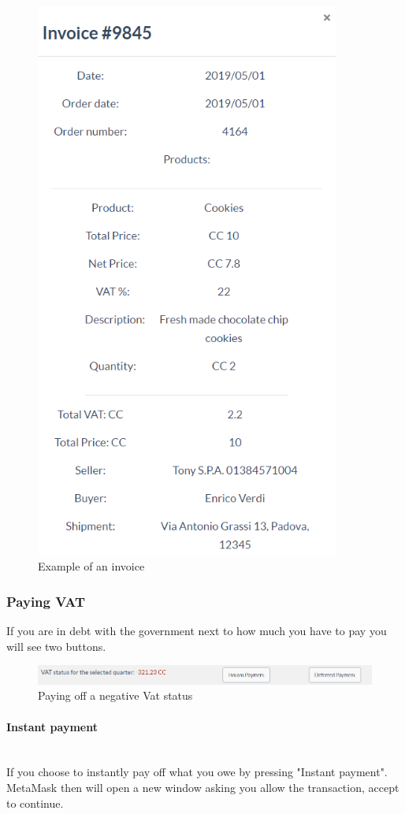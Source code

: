 	\begin{figure}[H]
		\includegraphics[width=10cm]{res/images/invoice_details.png}
		\centering
		\caption{Example of an invoice}
	\end{figure}
	\subsubsection{Paying VAT}
	If you are in debt with the government next to how much you have to pay 
	you will see two buttons.
	\begin{figure}[H]
		\includegraphics[width=15cm]{res/images/paying_vat.png}
		\centering
		\caption{Paying off a negative Vat status}
	\end{figure}
	\paragraph{Instant payment} \mbox{}\\
	If you choose to instantly pay off what you owe by pressing "Instant 
	payment". MetaMask then will open a new window asking you allow the 
	transaction, accept to continue.
